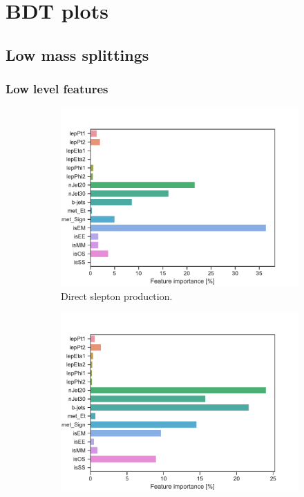 \chapter{BDT plots}
\label{sec:appBDTplots}


\section{Low mass splittings}
\subsection{Low level features}

\newpage

\begin{figure}[H]
    \centering
    \begin{subfigure}[t!]{0.49\textwidth}
        \includegraphics[width = \textwidth]{Figures/SlepSlep/ML/BDT/Low_level/Low/featureImportance.pdf}
        \caption{Direct slepton production.}
        \label{fig:}
    \end{subfigure}
    \begin{subfigure}[t!]{0.49\textwidth}
        \includegraphics[width = \textwidth]{Figures/SlepSnu/BDT/Low_level/Low/featureImportance.pdf}

\end{subfigure}
\end{figure}
